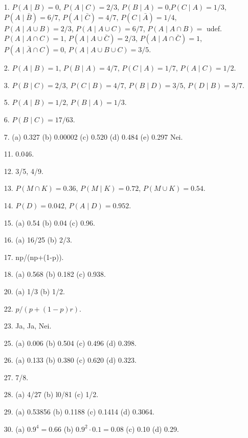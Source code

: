 \begin{itemize}                                                        
\item[1.]  $P(A\mid B)=0$, $P(A\mid C)=2/3$, $P(B\mid A)=0$,$P(C\mid A)=1/3$,\\
         $P(A\mid \bar B)=6/7$, $P(A\mid \bar C)=4/7$, $P(C\mid \bar A)=1/4$,\\
           $P(A\mid A\cup B)=2/3$,  $P(A\mid A\cup C)=6/7$,
           $P(A\mid A\cap B)=$ udef.\\  $P(A\mid A\cap C)=1$,
           $P(A\mid A\cup \bar C)=2/3$, $P(A\mid A\cap \bar C)=1$,\\
           $P(A\mid \bar A\cap C)=0$,
           $P(A\mid A\cup B\cup C)=3/5$.                
\item[2.]  $P(A\mid B)=1$, $P(B\mid A)=4/7$, $P(C\mid A)=1/7$, $P(A\mid C)=1/2$.
\item[3.]  $P(B\mid C)=2/3$, $P(C\mid B)=4/7$, $P(B\mid D)=3/5$, $P(D\mid B)=3/7$.
\item[5.]  $P(A\mid B)=1/2$, $P(B\mid A)=1/3$.
\item[6.]  $P(B\mid C)=17/63$.
\item[7.]  (a) 0.327  (b) 0.00002  (c) 0.520  (d) 0.484   (e) 0.297  Nei.
\item[11.]  0.046.
\item[12.]  3/5, 4/9.
\item[13.]  $P(M\cap K)=0.36$,  $P(M\mid K)=0.72$, $P(M\cup K)=0.54$.
\item[14.]  $P(D)=0.042$,  $P(A\mid D)=0.952$.
\item[15.]  (a)  0.54    (b)  0.04   (c)  0.96.
\item[16.]  (a)  16/25   (b)  2/3.
\item[17.]  np/(np+(1-p)).
\item[18.]  (a)  0.568    (b)  0.182    (c)  0.938.
\item[20.]  (a)  1/3    (b)  1/2.
\item[22.]  $p/(p+(1-p)r)$.
\item[23.]  Ja,  Ja,  Nei.
\item[25.]  (a)  0.006   (b)  0.504   (c)  0.496   (d)  0.398.
\item[26.]  (a)  0.133   (b)  0.380   (c)  0.620   (d)  0.323.
\item[27.]  7/8.
\item[28.]  (a)  4/27   (b)  l0/81   (c)  1/2.
\item[29.]  (a)  0.53856   (b)  0.1188   (c)  0.1414   (d)  0.3064.
\item[30.]  (a)  $0.9^4 =0.66$   (b) $0.9^2 \cdot0.1=0.08$ (c) 0.10  (d) 0.29.

\end{itemize}
